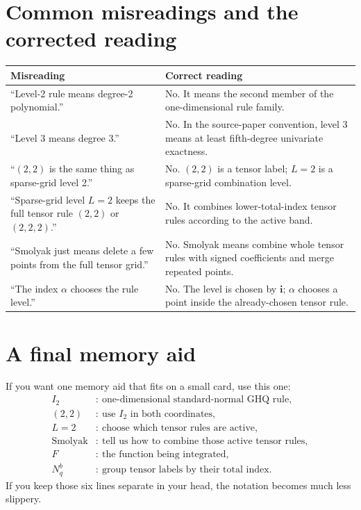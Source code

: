 \documentclass[11pt]{article}
\begin{document}
\section{Common misreadings and the corrected reading}
\label{sec:misreadings}

\begin{center}
\begin{tabular}{@{}p{}p{}@{}}
\toprule
Misreading & Correct reading \\
\midrule
``Level-2 rule means degree-2 polynomial.'' & No.  It means the second member of the one-dimensional rule family. \\
``Level 3 means degree 3.'' & No.  In the source-paper convention, level 3 means at least fifth-degree univariate exactness. \\
``\((2,2)\) is the same thing as sparse-grid level 2.'' & No.  \((2,2)\) is a tensor label; \(L=2\) is a sparse-grid combination level. \\
``Sparse-grid level \(L=2\) keeps the full tensor rule \((2,2)\) or \((2,2,2)\).'' & No.  It combines lower-total-index tensor rules according to the active band. \\
``Smolyak just means delete a few points from the full tensor grid.'' & No.  Smolyak means combine whole tensor rules with signed coefficients and merge repeated points. \\
``The index \(\alpha\) chooses the rule level.'' & No.  The level is chosen by \(\mathbf i\); \(\alpha\) chooses a point inside the already-chosen tensor rule. \\
\bottomrule
\end{tabular}
\end{center}

\section{A final memory aid}
\label{sec:memory-aid}

If you want one memory aid that fits on a small card, use this one:
\begin{align*}
  I_2 &:\ \text{one-dimensional standard-normal GHQ rule},\\
  (2,2) &:\ \text{use } I_2 \text{ in both coordinates},\\
  L=2 &:\ \text{choose which tensor rules are active},\\
  \text{Smolyak} &:\ \text{tell us how to combine those active tensor rules},\\
  F &:\ \text{the function being integrated},\\
  N_q^b &:\ \text{group tensor labels by their total index}.
\end{align*}
If you keep those six lines separate in your head, the notation becomes much less
slippery.
\end{document}
